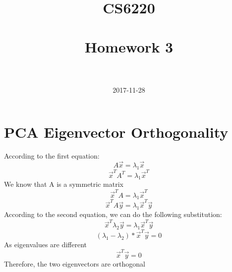 \documentclass[paper=a4, fontsize=11pt]{scrartcl} %
\title{	
\normalfont \normalsize 
\textsc{CS6220} \\ [25pt] %
\horrule{0.5pt} \\[0.4cm] %
\huge Homework 3 \\ %
\horrule{2pt} \\[0.5cm] %
}
\author{} %
\date{\normalsize2017-11-28} %
\begin{document}
\maketitle %


\section{PCA Eigenvector Orthogonality}

According to the first equation:
\[
	A \vec{x} = \lambda_1 \vec{x}
\]
\[
	\vec{x}^T A^T = \lambda_1 \vec{x}^T
\]
We know that A is a symmetric matrix
\[
	\vec{x}^T A = \lambda_1 \vec{x}^T
\]
\[
	\vec{x}^T A \vec{y} = \lambda_1 \vec{x}^T \vec{y}
\]
According to the second equation, we can do the following substitution:
\[
	\vec{x}^T \lambda_2 \vec{y} = \lambda_1 \vec{x}^T \vec{y}
\]
\[
	(\lambda_1 - \lambda_2 ) * \vec{x}^T \vec{y} = 0
\]
As eigenvalues are different
\[
	\vec{x}^T \vec{y} = 0
\]
Therefore, the two eigenvectors are orthogonal
\end{document}
